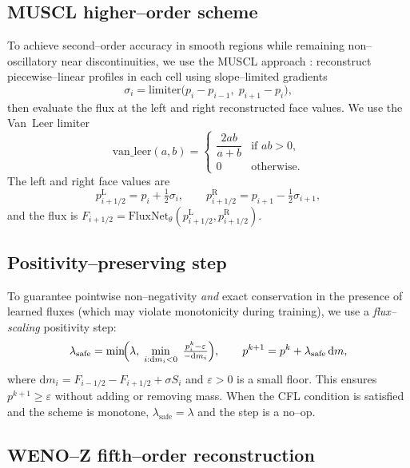 \documentclass[10pt]{article}
\theoremstyle{definition}
\theoremstyle{remark}
\newcommand{\Eps}{\varepsilon}
\newcommand{\FluxNet}{\mathrm{FluxNet}}
\begin{document}
\subsection{MUSCL higher--order scheme}
\label{sec:muscl}

To achieve second--order accuracy in smooth regions while remaining
non--oscillatory near discontinuities, we use the MUSCL approach
\cite{vanleer1979towards}: reconstruct piecewise--linear profiles in
each cell using slope--limited gradients
\[
  \sigma_i = \mathrm{limiter}\bigl(p_i - p_{i-1},\; p_{i+1} - p_i\bigr),
\]
then evaluate the flux at the left and right reconstructed face values.
We use the Van~Leer limiter
\[
  \mathrm{van\_leer}(a,b) = \begin{cases}
    \dfrac{2ab}{a+b} & \text{if } ab > 0,\\[2pt]
    0 & \text{otherwise.}
  \end{cases}
\]
The left and right face values are
\[
  p^\text{L}_{i+1/2} = p_i + \tfrac{1}{2}\sigma_i,
  \qquad
  p^\text{R}_{i+1/2} = p_{i+1} - \tfrac{1}{2}\sigma_{i+1},
\]
and the flux is $F_{i+1/2} = \FluxNet_\theta(p^\text{L}_{i+1/2}, p^\text{R}_{i+1/2})$.

\subsection{Positivity--preserving step}

To guarantee pointwise non--negativity \emph{and} exact conservation
in the presence of learned fluxes (which may violate monotonicity
during training), we use a \emph{flux--scaling} positivity step:
\[
  \lambda_\text{safe} = \min\!\Bigl(\lambda,\;\min_{i: \mathrm{d}m_i<0}\;\tfrac{p^k_i - \Eps}{-\mathrm{d}m_i}\Bigr),
  \qquad
  p^{k+1} = p^k + \lambda_\text{safe}\,\mathrm{d}m,
\]
where $\mathrm{d}m_i = F_{i-1/2} - F_{i+1/2} + \sigma S_i$ and $\Eps>0$ is a
small floor.  This ensures $p^{k+1}\ge \Eps$ without adding or removing
mass.  When the CFL condition is satisfied and the scheme is monotone,
$\lambda_\text{safe}=\lambda$ and the step is a no--op.

\subsection{WENO--Z fifth--order reconstruction}
\label{sec:weno5}
\end{document}

